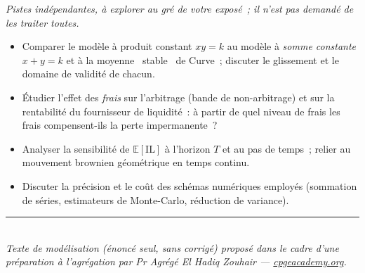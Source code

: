 \documentclass[11pt,a4paper]{article}
\begin{document}
\emph{Pistes indépendantes, à explorer au gré de votre exposé~; il n'est pas demandé de les
traiter toutes.}
\begin{itemize}[nosep,leftmargin=1.3em]
  \item Comparer le modèle à produit constant $xy=k$ au modèle à \emph{somme constante} $x+y=k$
        et à la moyenne \guillemotleft~stable~\guillemotright{} de Curve~; discuter le glissement
        et le domaine de validité de chacun.
  \item Étudier l'effet des \emph{frais} sur l'arbitrage (bande de non-arbitrage) et sur la
        rentabilité du fournisseur de liquidité~: à partir de quel niveau de frais les frais
        compensent-ils la perte impermanente~?
  \item Analyser la sensibilité de $\mathbb{E}[\mathrm{IL}]$ à l'horizon $T$ et au pas de temps~;
        relier au mouvement brownien géométrique en temps continu.
  \item Discuter la précision et le coût des schémas numériques employés (sommation de séries,
        estimateurs de Monte-Carlo, réduction de variance).
\end{itemize}

\vfill
\noindent\rule{\linewidth}{0.3pt}\\
{\footnotesize\itshape Texte de modélisation (énoncé seul, sans corrigé) proposé dans le cadre
d'une préparation à l'agrégation par Pr Agrégé El Hadiq Zouhair --- \href{https://cpgeacademy.org}{cpgeacademy.org}.}
\end{document}
